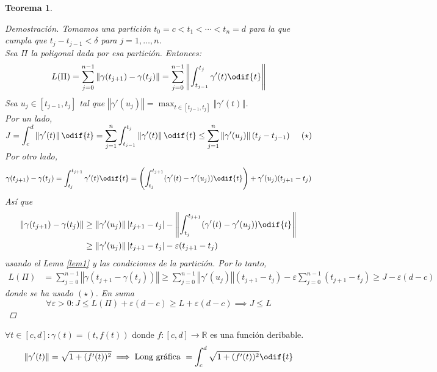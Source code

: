 \documentclass[12pt]{article}
\theoremstyle{plain}
\newtheorem{teo}{Teorema}[subsection]
\newenvironment{dem}[1][]{%
  \begin{adjustwidth}{1cm}{0cm} \begin{proof}[Demostración\ifx\relax#1\relax\else{ (#1)}\fi]
}{\end{proof}\end{adjustwidth}}
\newcommand{\R}{\mathbb{R}}
\newcommand{\norm}[1]{\left\Vert#1\right\Vert}
\newcommand{\appl}[3]{#1 \colon #2 \longrightarrow #3}
\newcommand{\ds}{\displaystyle}
\newcommand{\tex}[1]{\text{#1}}
\renewcommand{\norm}[1]{\left\Vert#1\right\Vert}
\begin{document}
\begin{teo}
\begin{dem}
        Tomamos una partición $\ds t_0=c<t_1<\cdots <t_n=d$ para la que cumpla que $\ds t_j-t_{j-1}<\delta$ para $\ds j=1, \dots, n$. \\
        Sea $\Pi$ la poligonal dada por esa partición. Entonces:
        \[L(\Pi)=\sum_{j=0}^{n-1}\norm{\gamma(t_{j+1})-\gamma(t_j)}=\sum_{j=0}^{n-1}\norm{\int_{t_{j-1}}^{t_j}\gamma'(t)\odif{t}}\]
        Sea $\ds u_j\in \left[t_{j-1}, t_j\right]$ tal que $\ds\norm{\gamma'(u_j)}=\max_{t\in \left[t_{j-1}, t_j\right]}\norm{\gamma'(t)}$. \\
        Por un lado, $\ds J=\int_c^d\norm{\gamma'(t)}\odif{t} = \sum_{j=1}^n \int_{t_{j-1}}^{t_j}\norm{\gamma'(t)}\odif{t} \leq \sum_{j=1}^n\norm{\gamma'(u_j)}(t_j-t_{j-1}) \hspace{0.5cm} (\star)$ \\
        Por otro lado, \[\ds \gamma(t_{j+1})-\gamma(t_j) = \int_{t_j}^{t_{j+1}}\gamma'(t)\odif{t}=\left(\int_{t_j}^{t_{j+1}}(\gamma'(t)-\gamma'(u_j))\odif{t}\right)+\gamma'(u_j)(t_{j+1}-t_j)\]
        Así que \begin{equation*}
            \begin{split}
                \norm{\gamma(t_{j+1})-\gamma(t_j)} & \geq  \norm{\gamma'(u_j)}|t_{j+1}-t_j|-\norm{\int_{t_j}^{t_{j+1}}(\gamma'(t)-\gamma'(u_j))\odif{t}} \\ & \geq  \norm{\gamma'(u_j)}|t_{j+1}-t_j|-\varepsilon(t_{j+1}-t_j)
            \end{split}
        \end{equation*}
        usando el Lema \ref{lem1} y las condiciones de la partición.
        Por lo tanto, \begin{equation*}\begin{split}
            L(\Pi) &=\sum_{j=0}^{n-1}\norm{\gamma(t_{j+1}-\gamma(t_j))}
            \geq \sum_{j=0}^{n-1}\norm{\gamma'(u_j)}(t_{j+1}-t_j)-\varepsilon\sum_{j=0}^{n-1}(t_{j+1}-t_j) \geq J -\varepsilon(d-c)
        \end{split}\end{equation*}
        donde se ha usado $(\star)$. En suma
        \[\forall \varepsilon > 0 : J\leq L(\Pi) + \varepsilon(d-c)\geq L + \varepsilon(d-c) \implies J \leq L\]
    \end{dem}
\end{teo}
\begin{ejem} 
    $\ds \forall t \in \left[c, d\right] : \gamma(t)=(t, f(t))$ donde $\appl{f}{\left[c, d\right]}{\R}$ es una función deribable.
    \[ \norm{\gamma'(t)}=\sqrt{1+(f'(t))^2} \implies \tex{Long gráfica }=\int_c^d \sqrt{1+(f'(t))^2} \odif{t}\]
\end{ejem}
\end{document}
